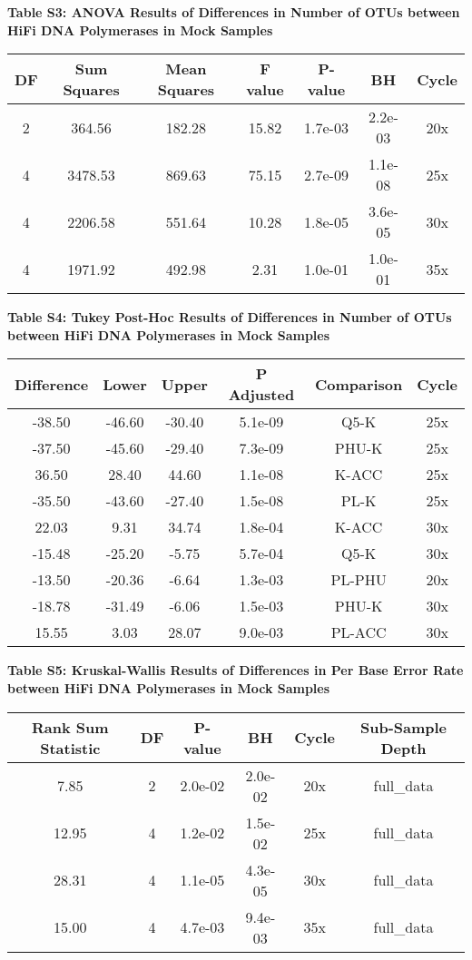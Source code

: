 \documentclass[12pt,]{article}
\begin{document}
\newpage

\textbf{Table S3: ANOVA Results of Differences in Number of OTUs between
HiFi DNA Polymerases in Mock Samples}

\begin{longtable}[]{@{}ccccccc@{}}
\toprule
DF & Sum Squares & Mean Squares & F value & P-value & BH &
Cycle\tabularnewline
\midrule
\endhead
2 & 364.56 & 182.28 & 15.82 & 1.7e-03 & 2.2e-03 & 20x\tabularnewline
4 & 3478.53 & 869.63 & 75.15 & 2.7e-09 & 1.1e-08 & 25x\tabularnewline
4 & 2206.58 & 551.64 & 10.28 & 1.8e-05 & 3.6e-05 & 30x\tabularnewline
4 & 1971.92 & 492.98 & 2.31 & 1.0e-01 & 1.0e-01 & 35x\tabularnewline
\bottomrule
\end{longtable}

\newpage

\textbf{Table S4: Tukey Post-Hoc Results of Differences in Number of
OTUs between HiFi DNA Polymerases in Mock Samples}

\begin{longtable}[]{@{}cccccc@{}}
\toprule
Difference & Lower & Upper & P Adjusted & Comparison &
Cycle\tabularnewline
\midrule
\endhead
-38.50 & -46.60 & -30.40 & 5.1e-09 & Q5-K & 25x\tabularnewline
-37.50 & -45.60 & -29.40 & 7.3e-09 & PHU-K & 25x\tabularnewline
36.50 & 28.40 & 44.60 & 1.1e-08 & K-ACC & 25x\tabularnewline
-35.50 & -43.60 & -27.40 & 1.5e-08 & PL-K & 25x\tabularnewline
22.03 & 9.31 & 34.74 & 1.8e-04 & K-ACC & 30x\tabularnewline
-15.48 & -25.20 & -5.75 & 5.7e-04 & Q5-K & 30x\tabularnewline
-13.50 & -20.36 & -6.64 & 1.3e-03 & PL-PHU & 20x\tabularnewline
-18.78 & -31.49 & -6.06 & 1.5e-03 & PHU-K & 30x\tabularnewline
15.55 & 3.03 & 28.07 & 9.0e-03 & PL-ACC & 30x\tabularnewline
\bottomrule
\end{longtable}

\newpage

\textbf{Table S5: Kruskal-Wallis Results of Differences in Per Base
Error Rate between HiFi DNA Polymerases in Mock Samples}

\begin{longtable}[]{@{}cccccc@{}}
\toprule
Rank Sum Statistic & DF & P-value & BH & Cycle & Sub-Sample
Depth\tabularnewline
\midrule
\endhead
7.85 & 2 & 2.0e-02 & 2.0e-02 & 20x & full\_data\tabularnewline
12.95 & 4 & 1.2e-02 & 1.5e-02 & 25x & full\_data\tabularnewline
28.31 & 4 & 1.1e-05 & 4.3e-05 & 30x & full\_data\tabularnewline
15.00 & 4 & 4.7e-03 & 9.4e-03 & 35x & full\_data\tabularnewline
\bottomrule
\end{longtable}

\newpage
\end{document}

